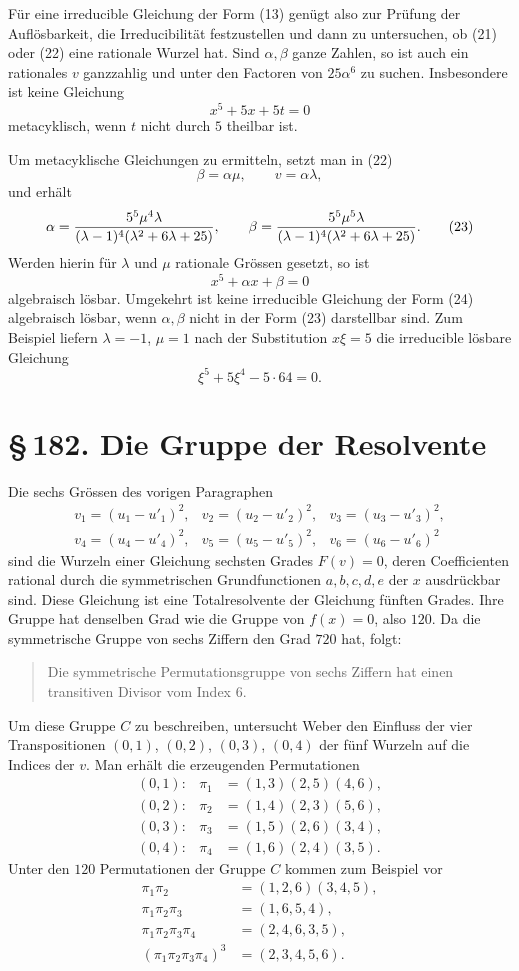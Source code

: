 \documentclass[11pt]{article}
\newcommand{\sect}[2]{\section*{\S\,#1. #2}}
\begin{document}
Für eine irreducible Gleichung der Form (13) genügt also zur Prüfung der Auflösbarkeit, die Irreducibilität festzustellen und dann zu untersuchen, ob (21) oder (22) eine rationale Wurzel hat. Sind $\alpha,\beta$ ganze Zahlen, so ist auch ein rationales $v$ ganzzahlig und unter den Factoren von $25\alpha^6$ zu suchen. Insbesondere ist keine Gleichung
\[
  x^5+5x+5t=0
\]
metacyklisch, wenn $t$ nicht durch $5$ theilbar ist.

Um metacyklische Gleichungen zu ermitteln, setzt man in (22)
\[
  \beta=\alpha\mu,
  \qquad v=\alpha\lambda,
\]
und erhält
\[
  \alpha={5^5\mu^4\lambda\over(\lambda-1)^4(\lambda^2+6\lambda+25)},
  \qquad
  \beta={5^5\mu^5\lambda\over(\lambda-1)^4(\lambda^2+6\lambda+25)}. \tag{23}
\]
Werden hierin für $\lambda$ und $\mu$ rationale Grössen gesetzt, so ist
\[
  x^5+\alpha x+
\beta=0                                                     \tag{24}
\]
algebraisch lösbar. Umgekehrt ist keine irreducible Gleichung der Form (24) algebraisch lösbar, wenn $\alpha,
\beta$ nicht in der Form (23) darstellbar sind. Zum Beispiel liefern $\lambda=-1$, $\mu=1$ nach der Substitution $x\xi=5$ die irreducible lösbare Gleichung
\[
  \xi^5+5\xi^4-5\cdot64=0.
\]

\sect{182}{Die Gruppe der Resolvente}

Die sechs Grössen des vorigen Paragraphen
\[
\begin{array}{lll}
 v_1=(u_1-u'_1)^2,& v_2=(u_2-u'_2)^2,& v_3=(u_3-u'_3)^2,\\
 v_4=(u_4-u'_4)^2,& v_5=(u_5-u'_5)^2,& v_6=(u_6-u'_6)^2
\end{array}                                                       \tag{1}
\]
sind die Wurzeln einer Gleichung sechsten Grades $F(v)=0$, deren Coefficienten rational durch die symmetrischen Grundfunctionen $a,b,c,d,e$ der $x$ ausdrückbar sind. Diese Gleichung ist eine Totalresolvente der Gleichung fünften Grades. Ihre Gruppe hat denselben Grad wie die Gruppe von $f(x)=0$, also $120$. Da die symmetrische Gruppe von sechs Ziffern den Grad $720$ hat, folgt:
\begin{quote}
Die symmetrische Permutationsgruppe von sechs Ziffern hat einen transitiven Divisor vom Index $6$.
\end{quote}

Um diese Gruppe $C$ zu beschreiben, untersucht Weber den Einfluss der vier Transpositionen $(0,1)$, $(0,2)$, $(0,3)$, $(0,4)$ der fünf Wurzeln auf die Indices der $v$. Man erhält die erzeugenden Permutationen
\[
\begin{array}{rcl}
(0,1):&\pi_1&=(1,3)(2,5)(4,6),\\
(0,2):&\pi_2&=(1,4)(2,3)(5,6),\\
(0,3):&\pi_3&=(1,5)(2,6)(3,4),\\
(0,4):&\pi_4&=(1,6)(2,4)(3,5).
\end{array}
\]
Unter den $120$ Permutationen der Gruppe $C$ kommen zum Beispiel vor
\[
\begin{aligned}
\pi_1\pi_2&=(1,2,6)(3,4,5),\\
\pi_1\pi_2\pi_3&=(1,6,5,4),\\
\pi_1\pi_2\pi_3\pi_4&=(2,4,6,3,5),\\
(\pi_1\pi_2\pi_3\pi_4)^3&=(2,3,4,5,6).
\end{aligned}
\]
\end{document}
